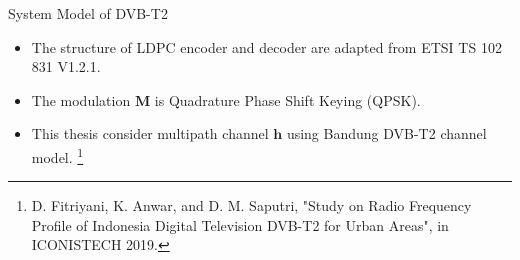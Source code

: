 \documentclass[11pt, aspectratio=169]{beamer}
\newcommand\blfootnote[1]{%
  \begingroup
  \renewcommand\thefootnote{}\footnote{#1}%
  \addtocounter{footnote}{-1}%
  \endgroup
}
\begin{document}
\begin{frame}{System Model of DVB-T2}
\vspace{-5pt}
\begin{itemize}
\item The structure of LDPC encoder and decoder are adapted from ETSI TS 102 831 V1.2.1.
\item The modulation $\mathbf{M}$ is Quadrature Phase Shift Keying (QPSK). 
\item This thesis consider multipath channel $\mathbf{h}$ using Bandung DVB-T2 channel model.\blfootnote{\tiny{D. Fitriyani, K. Anwar, and D. M. Saputri, "Study on Radio Frequency Profile of Indonesia Digital Television DVB-T2 for Urban Areas", in ICONISTECH 2019.}}
\end{itemize}
\end{frame}
\end{document}
